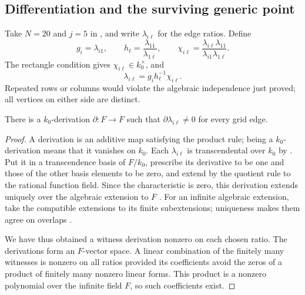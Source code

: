 \subsection{Differentiation and the surviving generic point}

Take \(N=20\) and \(j=5\) in , and write
\(\lambda_{i\ell}\) for the edge ratios. Define
\[
 g_i=\lambda_{i1},\qquad
 h_\ell=\frac{\lambda_{11}}{\lambda_{1\ell}},\qquad
 \chi_{i\ell}=\frac{\lambda_{i\ell}\lambda_{11}}
                         {\lambda_{i1}\lambda_{1\ell}}.
\]
The rectangle condition gives \(\chi_{i\ell}\in k_0^\times\), and
\begin{equation}\label{alg:factorization}
 \lambda_{i\ell}=g_i h_\ell^{-1}\chi_{i\ell}.
\end{equation}
Repeated rows or columns would violate the algebraic independence just
proved; all vertices on either side are distinct.

\begin{lemma}\label{alg:derivation}
There is a \(k_0\)-derivation \(\partial:F\to F\) such that
\(\partial\lambda_{i\ell}\ne0\) for every grid edge.
\end{lemma}

\begin{proof}
A derivation is an additive map satisfying the product rule; being a
\(k_0\)-derivation means that it vanishes on \(k_0\). Each
\(\lambda_{i\ell}\) is transcendental over \(k_0\) by
. Put it in a transcendence basis of
\(F/k_0\), prescribe its derivative to be one and those of the other
basis elements to be zero, and extend by the quotient rule to the
rational function field. Since the characteristic is zero, this
derivation extends uniquely over the algebraic extension to \(F\)
\cite[Theorems~1.5 and~4.1]{conradSeparability}.
For an infinite algebraic extension, take the compatible extensions
to its finite subextensions; uniqueness makes them agree on overlaps
\cite[Section~5]{conradSeparability}.

We have thus obtained a witness derivation nonzero on each chosen
ratio. The derivations form an \(F\)-vector space. A linear combination
of the finitely many witnesses is nonzero on all ratios provided its
coefficients avoid the zeros of a product of finitely many nonzero
linear forms. This product is a nonzero polynomial over the infinite
field \(F\), so such coefficients exist.
\end{proof}

